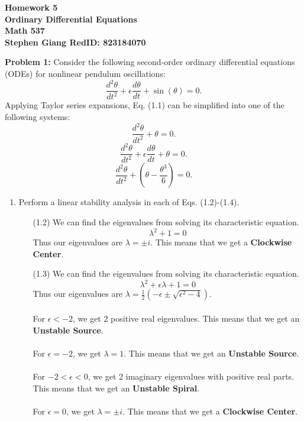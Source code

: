 \documentclass[11pt]{article}
\newcommand{\skipline}{\vspace{\baselineskip}}
\newenvironment{problem}[1]{\textbf{Problem #1: }}{\newpage}
\begin{document}
	
	\begin{center}
		\textbf{Homework 5} \\
		\textbf{Ordinary Differential Equations} \\
		\textbf{Math 537} \\
		\textbf{Stephen Giang RedID: 823184070} \\
		\skipline \skipline
	\end{center}

	\begin{problem}{1}
		Consider the following second-order ordinary differential equations (ODEs) for nonlinear pendulum oscillations:
		\[\frac{d^2\theta}{dt^2} + \epsilon\frac{d\theta}{dt} + \sin(\theta) = 0. \tag{1.1}\]
		Applying Taylor series expansions, Eq. (1.1) can be simplified into one of the
		following systems:
		\[\frac{d^2\theta}{dt^2} + \theta = 0. \tag{1.2} \]
		\[\frac{d^2\theta}{dt^2} + \epsilon\frac{d\theta}{dt} + \theta = 0. \tag{1.3}\]
		\[\frac{d^2\theta}{dt^2} + \left(\theta - \frac{\theta^3}{6}\right) = 0. \tag{1.4}\]
		\begin{enumerate}[label = (\alph*)]
			\item  Perform a linear stability analysis in each of Eqs. (1.2)-(1.4).
			\begin{itemize}
				\item[(1.2) ] We can find the eigenvalues from solving its characteristic equation.
				\[\lambda^2 + 1 = 0\]
				Thus our eigenvalues are $\lambda = \pm i$.  This means that we get a \textbf{Clockwise Center}.
				\item[(1.3) ] We can find the eigenvalues from solving its characteristic equation.
				\[\lambda^2 + \epsilon\lambda + 1 = 0\]
				Thus our eigenvalues are $\lambda = \frac{1}{2}\left(-\epsilon \pm \sqrt{\epsilon^2 - 4}\right)$.
				\\ \\
				For $\epsilon < -2$, we get 2 positive real eigenvalues.  This means that we get an \textbf{Unstable Source}.
				\\ \\
				For $\epsilon = - 2$, we get $\lambda = 1$.  This means that we get an \textbf{Unstable Source}.
				\\ \\
				For $-2 < \epsilon < 0$, we get 2 imaginary eigenvalues with positive real parts.  This means that we get an \textbf{Unstable Spiral}.
				\\ \\
				For $\epsilon = 0$, we get $\lambda = \pm i$.  This means that we get a \textbf{Clockwise Center}.

\end{itemize}
\end{enumerate}
\end{problem}
\end{document}
